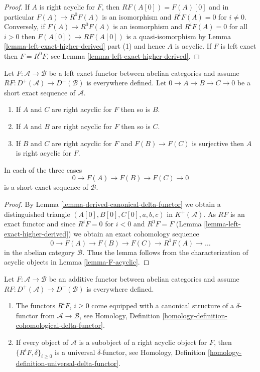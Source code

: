 \begin{proof}
If $A$ is right acyclic for $F$, then $RF(A[0]) = F(A)[0]$ and in
particular $F(A) \to R^0F(A)$ is an isomorphism and
$R^iF(A) = 0$ for $i \not = 0$. Conversely, if $F(A) \to R^0F(A)$
is an isomorphism and $R^iF(A) = 0$ for all $i > 0$ then
$F(A[0]) \to RF(A[0])$ is a quasi-isomorphism by
Lemma \ref{lemma-left-exact-higher-derived} part (1)
and hence $A$ is acyclic. If $F$ is left exact then $F = R^0F$, see
Lemma \ref{lemma-left-exact-higher-derived}.
\end{proof}

\begin{lemma}
\label{lemma-F-acyclic-ses}
Let $F : \mathcal{A} \to \mathcal{B}$ be a left exact functor
between abelian categories and assume
$RF : D^{+}(\mathcal{A}) \to D^{+}(\mathcal{B})$ is everywhere
defined. Let $0 \to A \to B \to C \to 0$ be a short exact sequence
of $\mathcal{A}$.
\begin{enumerate}
\item If $A$ and $C$ are right acyclic for $F$ then so is $B$.
\item If $A$ and $B$ are right acyclic for $F$ then so is $C$.
\item If $B$ and $C$ are right acyclic for $F$ and $F(B) \to F(C)$ is
surjective then $A$ is right acyclic for $F$.
\end{enumerate}
In each of the three cases
$$
0 \to F(A) \to F(B) \to F(C) \to 0
$$
is a short exact sequence of $\mathcal{B}$.
\end{lemma}

\begin{proof}
By
Lemma \ref{lemma-derived-canonical-delta-functor}
we obtain a distinguished triangle
$(A[0], B[0], C[0], a, b, c)$ in $K^{+}(\mathcal{A})$.
As $RF$ is an exact functor and since
$R^iF = 0$ for $i < 0$ and $R^0F = F$
(Lemma \ref{lemma-left-exact-higher-derived})
we obtain an exact cohomology sequence
$$
0 \to F(A) \to F(B) \to F(C) \to R^1F(A) \to \ldots
$$
in the abelian category $\mathcal{B}$. Thus the lemma follows from
the characterization of acyclic objects in
Lemma \ref{lemma-F-acyclic}.
\end{proof}

\begin{lemma}
\label{lemma-right-derived-delta-functor}
Let $F : \mathcal{A} \to \mathcal{B}$ be an additive functor
between abelian categories and assume
$RF : D^{+}(\mathcal{A}) \to D^{+}(\mathcal{B})$ is everywhere defined.
\begin{enumerate}
\item The functors $R^iF$, $i \geq 0$ come equipped with a canonical
structure of a $\delta$-functor from $\mathcal{A} \to \mathcal{B}$, see
Homology, Definition \ref{homology-definition-cohomological-delta-functor}.
\item If every object of $\mathcal{A}$ is a subobject of a right
acyclic object for $F$, then $\{R^iF, \delta\}_{i \geq 0}$ is a
universal $\delta$-functor, see
Homology, Definition \ref{homology-definition-universal-delta-functor}.
\end{enumerate}
\end{lemma}

